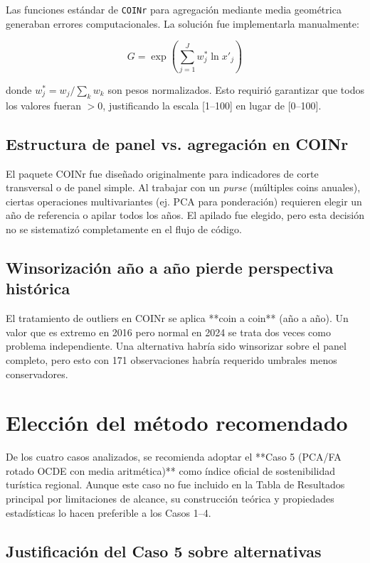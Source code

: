 Las funciones estándar de \texttt{COINr} para agregación mediante media geométrica generaban errores computacionales. La solución fue implementarla manualmente:

\begin{equation}
    G = \exp\left(\sum_{j=1}^{J} w_j^* \ln x'_j\right)
\end{equation}

donde $w_j^* = w_j / \sum_k w_k$ son pesos normalizados. Esto requirió garantizar que todos los valores fueran $> 0$, justificando la escala [1--100] en lugar de [0--100].

\subsection{Estructura de panel vs. agregación en COINr}

El paquete COINr fue diseñado originalmente para indicadores de corte transversal o de panel simple. Al trabajar con un \emph{purse} (múltiples coins anuales), ciertas operaciones multivariantes (ej. PCA para ponderación) requieren elegir un año de referencia o apilar todos los años. El apilado fue elegido, pero esta decisión no se sistematizó completamente en el flujo de código.

\subsection{Winsorización año a año pierde perspectiva histórica}

El tratamiento de outliers en COINr se aplica **coin a coin** (año a año). Un valor que es extremo en 2016 pero normal en 2024 se trata dos veces como problema independiente. Una alternativa habría sido winsorizar sobre el panel completo, pero esto con 171 observaciones habría requerido umbrales menos conservadores.

\section{Elección del método recomendado}

De los cuatro casos analizados, se recomienda adoptar el **Caso 5 (PCA/FA rotado OCDE con media aritmética)** como índice oficial de sostenibilidad turística regional. Aunque este caso no fue incluido en la Tabla de Resultados principal por limitaciones de alcance, su construcción teórica y propiedades estadísticas lo hacen preferible a los Casos 1--4.

\subsection{Justificación del Caso 5 sobre alternativas}


